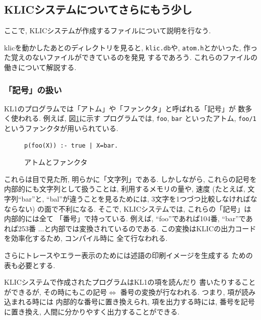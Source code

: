 \documentclass[a4,titlepage]{jsreport}
\begin{document}
\subsection{KLICシステムについてさらにもう少し}

ここで, KLICシステムが作成するファイルについて説明を行なう.  

klicを動かしたあとのディレクトリを見ると, \verb|klic.db|や, 
\verb|atom.h|とかいった, 作った覚えのないファイルができているのを発見
するであろう.  
これらのファイルの働きについて解説する.  

\subsubsection{「記号」の扱い}

KL1のプログラムでは「アトム」や「ファンクタ」と呼ばれる「記号」が
数多く使われる.  例えば, 図\ref{fig:atomFunc}に示す
プログラムでは, \verb|foo|, \verb|bar|
といったアトム, \verb|foo/1|というファンクタが用いられている.  

\begin{figure}
\begin{center}
\begin{minipage}{6cm}
\begin{Verbatim}[frame=single]
p(foo(X)) :- true | X=bar.
\end{Verbatim}
\end{minipage}
\caption{アトムとファンクタ}
\label{fig:atomFunc}
\end{center}
\end{figure}

これらは目で見た所, 明らかに「文字列」である.  しかしながら, 
これらの記号を内部的にも文字列として扱うことは, 利用するメモリの量や, 
速度 (たとえば, 文字列``bar''と, ``bal''が違うことを見るためには, 
3文字を1つづつ比較しなければなならない) の面で不利になる.  
そこで, KLICシステムでは, これらの「記号」は内部的には全て
「番号」で持っている.  例えば, ``foo''であれば104番, ``bar''であれば253番
$\ldots$と内部では変換されているのである.  
この変換はKLICの出力コードを効率化するため, コンパイル時に
全て行なわれる.  

さらにトレースやエラー表示のためには述語の印刷イメージを生成する
ための表も必要とする.

KLICシステムで作成されたプログラムはKL1の項を読んだり
書いたりすることができるが, その時にもこの記号$\Leftrightarrow$
番号の変換が行なわれる.  つまり, 項が読み込まれる時には
内部的な番号に置き換えられ, 項を出力する時には, 
番号を記号に置き換え, 人間に分かりやすく出力することができる.  
\end{document}
